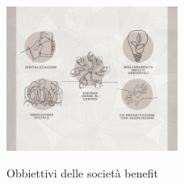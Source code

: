 \begin{figure}[H]
    \centering
    \includegraphics[alt={Obbiettivi delle società benefit}, width=0.5\textwidth]{img/soc-benefit.png}
    \caption{Obbiettivi delle società benefit}
    \label{fig:società benefit}
\end{figure}



\newpage